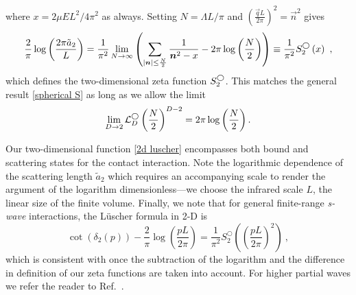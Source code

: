where $x=2\mu EL^2/4\pi^2$ as always.
Setting $N=\Lambda L/\pi$ and $\left(\frac{\vec{q}L}{2\pi}\right)^2=\vec{n}^2$ gives
\begin{equation}
    \frac{2}{\pi} \log \left(\frac{2\pi \tilde a_{2}}{L}\right)
    =
    \frac{1}{\pi^2}
    \lim_{N\to\infty}
    \left(
        \sum_{|\boldsymbol{n}|\le \frac{N}{2}} \frac{1}{\boldsymbol{n}^2-x}
        -2\pi \log \left(\frac{N}{2}\right)
    \right)
    \equiv
    \frac{1}{\pi^2}S^{\bigcirc}_2\left(x\right)\ ,\label{eq:2d luscher}
\end{equation}
which defines the two-dimensional zeta function $S^{\bigcirc}_2$.
This matches the general result \eqref{spherical S} as long as we allow the limit
\begin{equation}
    \lim_{D\to2}\mathcal{L}_D^\bigcirc \left(\frac{N}{2}\right)^{D-2}=2\pi \log \left(\frac{N}{2}\right).
\end{equation}

Our two-dimensional \Luscher function \eqref{2d luscher} encompasses both bound and scattering states for the contact interaction.
Note the logarithmic dependence of the scattering length $\tilde a_{2}$ which requires an accompanying scale to render the argument of the logarithm dimensionless---we choose the infrared scale $L$, the linear size of the finite volume.
Finally, we note that for general finite-range \emph{s-wave} interactions, the L\"uscher formula in 2-D is
\begin{equation}\label{eq:full 2d luescher}
\cot(\delta_{2}(p))-\frac{2}{\pi}\log\left(\frac{pL}{2\pi}\right) = \frac{1}{\pi^2}S^\bigcirc_2\left(\left(\frac{pL}{2\pi}\right)^2\right)\ ,
\end{equation}
which is consistent with  once the subtraction of the logarithm and the difference in definition of our zeta functions are taken into account. For higher partial waves we refer the reader to Ref.~\cite{Fiebig:1994qi}.
